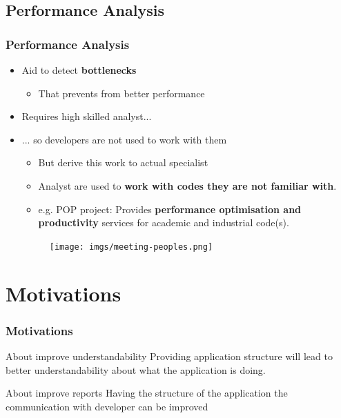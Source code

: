 \documentclass{beamer}
\begin{document}
\subsection{Performance Analysis}
\begin{frame}
\frametitle{Performance Analysis}
\begin{itemize}
	\item Aid to detect \textbf{bottlenecks}
	\begin{itemize}
		\item That prevents from better performance
	\end{itemize}
	\item Requires high skilled analyst...
	\item ... so developers are not used to work with them
	\begin{itemize}
		\item But derive this work to actual specialist
		\item Analyst are used to \textbf{work with codes they are not familiar with}.
		\item e.g. POP project: Provides \textbf{performance optimisation and productivity} services for academic and industrial code(s).
	\end{itemize}

	\begin{figure}
		\texttt{[image: imgs/meeting-peoples.png]}
	\end{figure}
\end{itemize}

%
\end{frame}

\section{Motivations}
\begin{frame}
\frametitle{Motivations}
\begin{block}{About improve understandability}
	Providing application structure will lead to better understandability about what the application is doing.
\end{block}
\pause
\begin{block}{About improve reports}
	Having the structure of the application the communication with developer can be improved
\end{block}
\end{frame}
\end{document}
